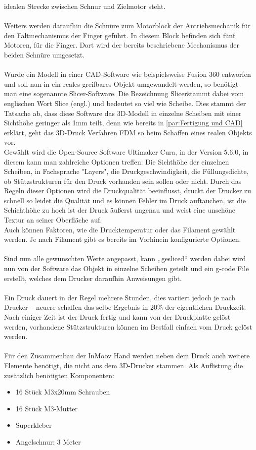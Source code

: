 \documentclass[titlepage,12pt,twoside]{article}
\begin{document}
idealen Strecke zwischen Schnur und Zielmotor steht. \\
\\
Weiters werden daraufhin die Schnüre zum Motorblock der Antriebsmechanik für den Faltmechanismus der Finger geführt. In diesem Block befinden sich fünf Motoren, für die Finger.
Dort wird der bereits beschriebene Mechanismus der beiden Schnüre umgesetzt. \\
\\
Wurde ein Modell in einer CAD-Software wie beispielsweise Fusion 360 entworfen und soll nun in ein reales greifbares Objekt umgewandelt werden, so benötigt man eine sogenannte Slicer-Software. Die Bezeichnung \"Slicer\" stammt dabei vom englischen 
Wort Slice (engl.) und bedeutet so viel wie Scheibe. Dies stammt der Tatsache ab, dass diese Software das 3D-Modell in einzelne Scheiben mit einer Sichthöhe geringer als 1mm teilt, denn wie bereits in \autoref{par:Fertigung und CAD} erklärt, geht das 3D-Druck Verfahren 
FDM so beim Schaffen eines realen Objekts vor. \\
Gewählt wird die Open-Source Software Ultimaker Cura, in der Version 5.6.0, in diesem kann man zahlreiche Optionen treffen: Die Sichthöhe der einzelnen Scheiben, in Fachsprache "Layers", die Druckgeschwindigkeit, die Füllungsdichte, ob Stützstrukturen für den 
Druck vorhanden sein sollen oder nicht. Durch das Regeln dieser Optionen wird die Druckqualität beeinflusst, druckt der Drucker zu schnell so leidet die Qualität und es können Fehler im Druck auftauchen, ist die Schichthöhe zu hoch ist der Druck 
äußerst ungenau und weist eine unschöne Textur an seiner Oberfläche auf. \\
Auch können Faktoren, wie die Drucktemperatur oder das Filament gewählt werden. Je nach Filament gibt es bereits im Vorhinein konfigurierte Optionen. \\
\\
Sind nun alle gewünschten Werte angepasst, kann „gesliced“ werden dabei wird nun von der Software das Objekt in einzelne Scheiben geteilt und ein g-code File erstellt, welches dem Drucker daraufhin Anweisungen gibt. \\
\\
Ein Druck dauert in der Regel mehrere Stunden, dies variiert jedoch je nach Drucker – neuere schaffen das selbe Ergebnis in 20\% der eigentlichen Druckzeit. \\
Nach einiger Zeit ist der Druck fertig und kann von der Druckplatte gelöst werden, vorhandene Stützstrukturen können im Bestfall einfach vom Druck gelöst werden. \\
\\
Für den Zusammenbau der InMoov Hand werden neben dem Druck auch weitere Elemente benötigt, die nicht aus dem 3D-Drucker stammen. 
Als Auflistung die zusätzlich benötigten Komponenten:
\begin{itemize}
	\item 16 Stück M3x20mm Schrauben
	\item 16 Stück M3-Mutter
	\item Superkleber
	\item Angelschnur: 3 Meter
\end{itemize}
\end{document}
